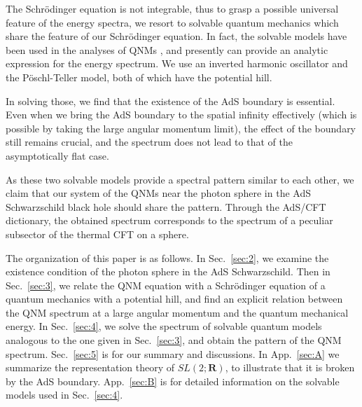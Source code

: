 \documentclass[a4paper,11pt]{article}
\begin{document}
The Schr\"odinger equation is not integrable, thus to grasp a possible universal feature of the energy spectra, 
we resort to solvable quantum mechanics which share the feature of our Schr\"odinger equation. In fact, the solvable models have been used in the analyses of QNMs \cite{Ferrari:1984ozr}, and presently can provide an analytic expression for the energy spectrum. We use
an inverted harmonic oscillator and the P\"oschl-Teller
model, both of which have the potential hill. 

In solving those, we find that the existence of the AdS boundary is essential. Even when we bring the AdS boundary to the spatial infinity effectively (which is possible by taking the large angular momentum limit), the effect of the boundary still remains crucial, and the spectrum does not lead to that of the asymptotically flat case.

As these two solvable models provide a spectral pattern similar to each other, we claim that our system of the QNMs near the photon sphere in the AdS Schwarzschild black hole should 
share the pattern. Through the AdS/CFT dictionary, the obtained spectrum corresponds to 
the spectrum of a peculiar subsector of the thermal CFT on a sphere.

The organization of this paper is as follows.
In Sec.~\ref{sec:2}, we examine the existence condition of the photon sphere in the AdS Schwarzschild. Then in 
Sec.~\ref{sec:3}, we relate the QNM equation with a Schr\"odinger equation of a quantum mechanics with a potential hill, and find an explicit relation between the QNM spectrum at a large angular momentum and the quantum mechanical energy. In Sec.~\ref{sec:4}, we solve the spectrum of solvable quantum models analogous to the one given in Sec.~\ref{sec:3}, and obtain the pattern of the QNM spectrum.
Sec.~\ref{sec:5} is for our summary and discussions. In App.~\ref{sec:A} we summarize the representation theory of $SL(2;\mathbf{R})$, to illustrate that it is broken by the AdS boundary. App.~\ref{sec:B} is for detailed information on the solvable models used in Sec.~\ref{sec:4}.
\end{document}
